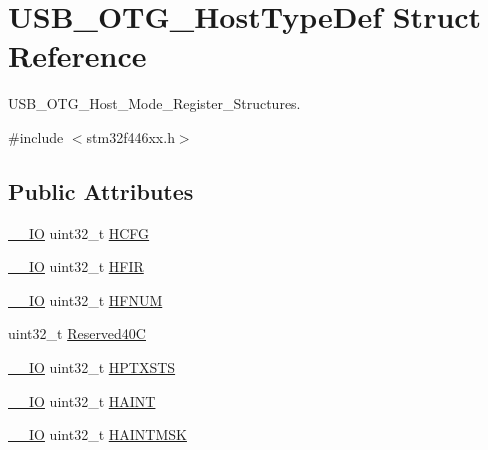 \hypertarget{struct_u_s_b___o_t_g___host_type_def}{}\section{U\+S\+B\+\_\+\+O\+T\+G\+\_\+\+Host\+Type\+Def Struct Reference}
\label{struct_u_s_b___o_t_g___host_type_def}


U\+S\+B\+\_\+\+O\+T\+G\+\_\+\+Host\+\_\+\+Mode\+\_\+\+Register\+\_\+\+Structures.  




{\ttfamily \#include $<$stm32f446xx.\+h$>$}

\subsection*{Public Attributes}
\begin{DoxyCompactItemize}
\item 
\hyperlink{core__sc300_8h_aec43007d9998a0a0e01faede4133d6be}{\+\_\+\+\_\+\+IO} uint32\+\_\+t \hyperlink{struct_u_s_b___o_t_g___host_type_def_ab44a72e139c005445aac54e866f7750f}{H\+C\+FG}
\item 
\hyperlink{core__sc300_8h_aec43007d9998a0a0e01faede4133d6be}{\+\_\+\+\_\+\+IO} uint32\+\_\+t \hyperlink{struct_u_s_b___o_t_g___host_type_def_a509fd299e7540892623954ea4dc1313c}{H\+F\+IR}
\item 
\hyperlink{core__sc300_8h_aec43007d9998a0a0e01faede4133d6be}{\+\_\+\+\_\+\+IO} uint32\+\_\+t \hyperlink{struct_u_s_b___o_t_g___host_type_def_ab4f17f7ef96cf4933e30b1950925c613}{H\+F\+N\+UM}
\item 
uint32\+\_\+t \hyperlink{struct_u_s_b___o_t_g___host_type_def_a0d4a262443e6d12c065adcafabf787ee}{Reserved40C}
\item 
\hyperlink{core__sc300_8h_aec43007d9998a0a0e01faede4133d6be}{\+\_\+\+\_\+\+IO} uint32\+\_\+t \hyperlink{struct_u_s_b___o_t_g___host_type_def_af095d2e3da9e07f63ed7da99276eaaca}{H\+P\+T\+X\+S\+TS}
\item 
\hyperlink{core__sc300_8h_aec43007d9998a0a0e01faede4133d6be}{\+\_\+\+\_\+\+IO} uint32\+\_\+t \hyperlink{struct_u_s_b___o_t_g___host_type_def_af3c15285d6f2efdf4890ea5b27258aca}{H\+A\+I\+NT}
\item 
\hyperlink{core__sc300_8h_aec43007d9998a0a0e01faede4133d6be}{\+\_\+\+\_\+\+IO} uint32\+\_\+t \hyperlink{struct_u_s_b___o_t_g___host_type_def_aa4ec75921a9699f77ee14f377e1b86dc}{H\+A\+I\+N\+T\+M\+SK}
\end{DoxyCompactItemize}


